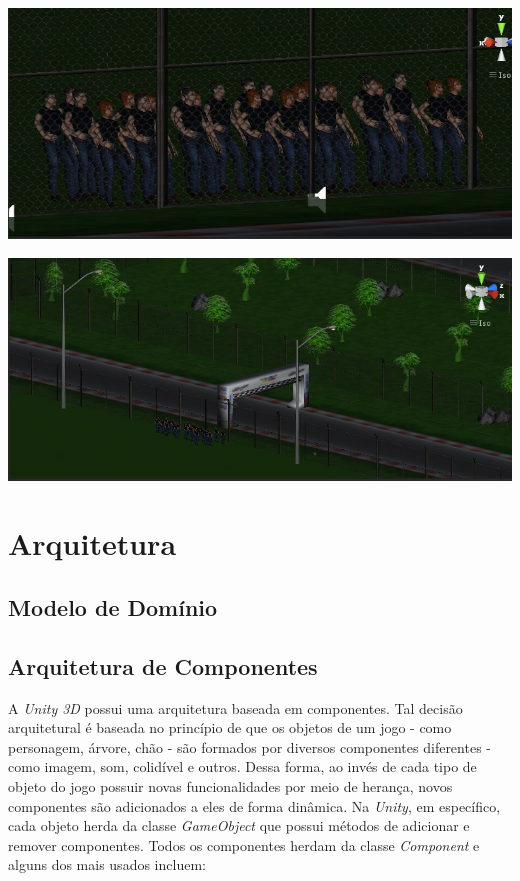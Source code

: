 \begin{center}
	\includegraphics[scale=0.4]{figuras/torcida}
	\label{figura:torcida}
\end{center}

\begin{center}
	\includegraphics[scale=0.4]{figuras/visaocima}
	\label{figura:visaodecima}
\end{center}

\section{Arquitetura}

\subsection{Modelo de Domínio}

\subsection{Arquitetura de Componentes}
A \textit{Unity 3D} possui uma arquitetura baseada em componentes. Tal decisão arquitetural é baseada no princípio de que os objetos de um jogo - como personagem, árvore, chão - são formados por diversos componentes diferentes - como imagem, som, colidível e outros. Dessa forma, ao invés de cada tipo de objeto do jogo possuir novas funcionalidades por meio de herança, novos componentes são adicionados a eles de forma dinâmica. Na \textit{Unity}, em específico, cada objeto herda da classe \textit{GameObject} que possui métodos de adicionar e remover componentes. Todos os componentes herdam da classe \textit{Component} e alguns dos mais usados incluem:

